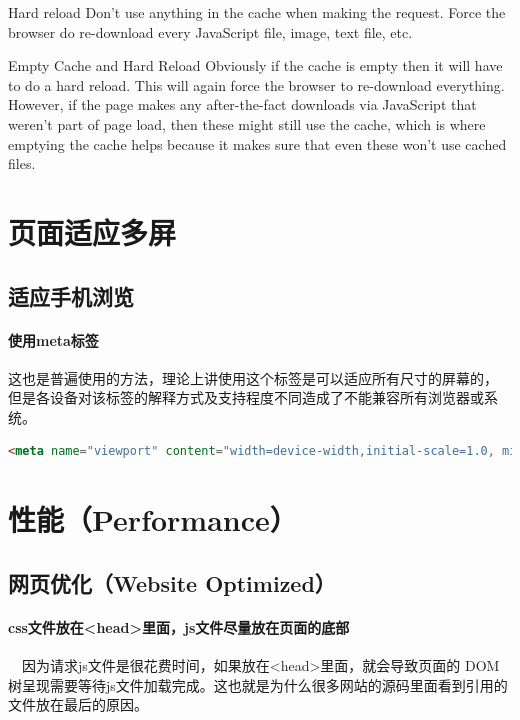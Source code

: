 \documentclass{book}
\begin{document}
Hard reload
Don't use anything in the cache when making the request. Force the browser do re-download every JavaScript file, image, text file, etc.

Empty Cache and Hard Reload
Obviously if the cache is empty then it will have to do a hard reload. This will again force the browser to re-download everything. However, if the page makes any after-the-fact downloads via JavaScript that weren't part of page load, then these might still use the cache, which is where emptying the cache helps because it makes sure that even these won't use cached files.


\section{页面适应多屏}

\subsection{适应手机浏览}
\paragraph{使用meta标签}这也是普遍使用的方法，理论上讲使用这个标签是可以适应所有尺寸的屏幕的，
但是各设备对该标签的解释方式及支持程度不同造成了不能兼容所有浏览器或系统。

\begin{lstlisting}[language=HTML]
<meta name="viewport" content="width=device-width,initial-scale=1.0, minimum-scale=1.0, maximum-scale=1.0, user-scalable=no"/>
\end{lstlisting}



\section{性能（Performance）}

\subsection{网页优化（Website Optimized）}

\paragraph{css文件放在<head>里面，js文件尽量放在页面的底部}~~因为请求js文件是很花费时间，如果放在<head>里面，就会导致页面的 DOM树呈现需要等待js文件加载完成。这也就是为什么很多网站的源码里面看到引用的文件放在最后的原因。
\end{document}

